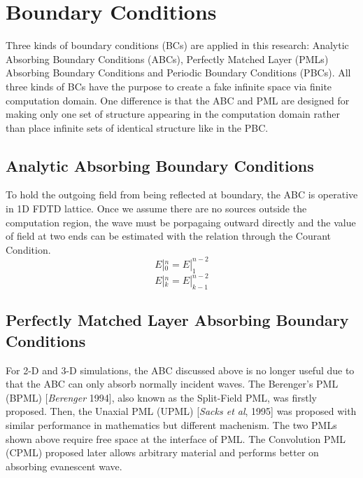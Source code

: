 \section{Boundary Conditions}
\label{sec:bcs}
Three kinds of boundary conditions (BCs) are applied in this research: Analytic Absorbing Boundary Conditions (ABCs),
Perfectly Matched Layer (PMLs) Absorbing Boundary Conditions and Periodic Boundary Conditions (PBCs). All three kinds of
BCs have the purpose to create a fake infinite space via finite computation domain. One difference is that the ABC and
PML are designed for making only one set of structure appearing in the computation domain rather than place infinite
sets of identical structure like in the PBC.


\subsection{Analytic Absorbing Boundary Conditions}
To hold the outgoing field from being reflected at boundary, the ABC is operative in 1D FDTD lattice. Once we assume
there are no sources outside the computation region, the wave must be porpagaing outward directly and the value of field
at two ends can be estimated with the relation through the Courant Condition.
\begin{equation}
  E|_0^n = E|_1^{n-2}
\end{equation}
\begin{equation}
  E|_k^n = E|_{k-1}^{n-2}
\end{equation}



\subsection{Perfectly Matched Layer Absorbing Boundary Conditions}
\label{subsec:pml}
For 2-D and 3-D simulations, the ABC discussed above is no longer useful due to that the ABC can only absorb normally
incident waves. The Berenger's PML (BPML) [\textit{Berenger} 1994], also known as the Split-Field PML, was firstly
proposed. Then, the Unaxial PML (UPML) [\textit{Sacks et al}, 1995] was proposed with similar performance in mathematics
but different machenism. The two PMLs shown above require free space at the interface of PML. The Convolution PML (CPML)
proposed later allows arbitrary material and performs better on absorbing evanescent wave.

